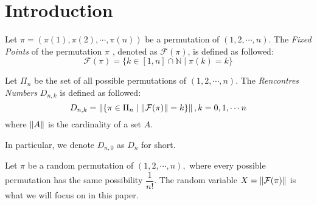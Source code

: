 
\section{Introduction}
Let $ \pi= (\pi(1), \pi(2),\cdots ,\pi(n))$ be a permutation of $ (1,2,\cdots ,n)$.
The \emph{Fixed Points} of the permutation $ \pi$ ,
denoted as $ \mathcal{F}(\pi)$, is defined as followed:
\[ \mathcal{F}(\pi) = \{ k \in [1,n]\cap \mathbb{N} \mid \pi(k) = k \}\]

Let $ \Pi_n$ be the set of all possible permutations of $ (1,2,\cdots ,n)$.
The \emph{Rencontres Numbers}\cite{wiki_rn}
$ D_{n,k}$ is defined as followed:
\[ D_{n,k} = \left\| \{ \pi \in \Pi_n \mid \left\|\mathcal{F}(\pi)\right\| = k \}\right\|, k = 0,1,\cdots n\]
where $ \left\|A\right\|$ is the cardinality of a set $ A$.

In particular, we denote $ D_{n,0}$ as $  D_{n} $ for short.

Let $ \pi $ be a random permutation of $ (1,2,\cdots ,n),$ where
every possible permutation has the same possibility $ \dfrac{1}{n!}$.
The random variable $ X = \left\|\mathcal{F}(\pi)\right\| $ is what we will focus on in this paper.

